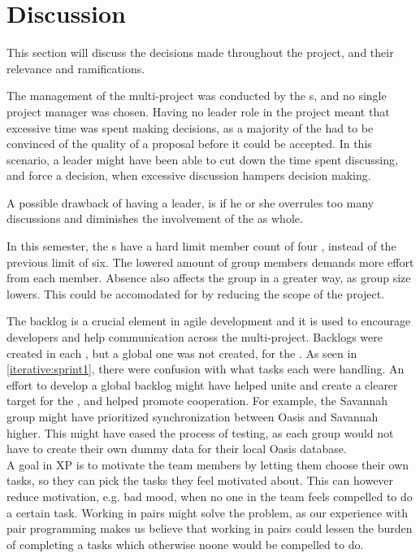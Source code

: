 \chapter{Discussion}
This section will discuss the decisions made throughout the project, and their relevance and ramifications. \newline

The management of the multi-project was conducted by the \localgroup[]s, and no single project manager was chosen.
Having no leader role in the project meant that excessive time was spent making decisions, as a majority of the \globalgroup[] had to be convinced of the quality of a proposal before it could be accepted.
In this scenario, a leader might have been able to cut down the time spent discussing, and force a decision, when excessive discussion hampers decision making.

A possible drawback of having a leader, is if he or she overrules too many discussions and diminishes the involvement of the \globalgroup[] as whole.\newline

In this semester, the \localgroup[]s have a hard limit member count of four \citep{web:rammestudyreg}, instead of the previous limit of six.
The lowered amount of group members demands more effort from each member.
Absence also affects the group in a greater way, as group size lowers. 
This could be accomodated for by reducing the scope of the project.\newline

The backlog is a crucial element in agile development and it is used to encourage developers and help communication across the multi-project.
Backlogs were created in each \localgroup[], but a global one was not created, for the \globalgroup[].
As seen in \autoref{iterative:sprint1}, there were confusion with what tasks each \localgroup[] were handling.
An effort to develop a global backlog might have helped unite and create a clearer target for the \globalgroup[], and helped promote cooperation.
For example, the Savannah group might have prioritized synchronization between Oasis and Savannah higher.
This might have eased the process of testing, as each group would not have to create their own dummy data for their local Oasis database.\\

A goal in XP is to motivate the team members by letting them choose their own tasks, so they can pick the tasks they feel motivated about.
This can however reduce motivation, e.g. bad mood, when no one in the team feels compelled to do a certain task.
Working in pairs might solve the problem, as our experience with pair programming makes us believe that working in pairs could lessen the burden of completing a tasks which otherwise noone would be compelled to do.\\

